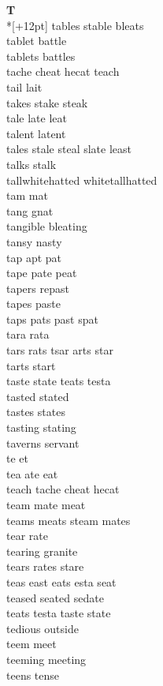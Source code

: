 \vspace{14pt}
\noindent\textbf{\Large T}\\*[+12pt]
tables stable bleats\\
tablet battle\\
tablets battles\\
tache cheat hecat teach\\
tail lait\\
takes stake steak\\
tale late leat\\
talent latent\\
tales stale steal slate least\\
talks stalk\\
tallwhitehatted whitetallhatted\\
tam mat\\
tang gnat\\
tangible bleating\\
tansy nasty\\
tap apt pat\\
tape pate peat\\
tapers repast\\
tapes paste\\
taps pats past spat\\
tara rata\\
tars rats tsar arts star\\
tarts start\\
taste state teats testa\\
tasted stated\\
tastes states\\
tasting stating\\
taverns servant\\
te et\\
tea ate eat\\
teach tache cheat hecat\\
team mate meat\\
teams meats steam mates\\
tear rate\\
tearing granite\\
tears rates stare\\
teas east eats esta seat\\
teased seated sedate\\
teats testa taste state\\
tedious outside\\
teem meet\\
teeming meeting\\
teens tense\\
